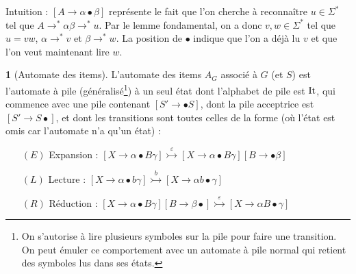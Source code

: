 \documentclass[10pt,a4paper,notitlepage]{article}
\theoremstyle{plain}
\theoremstyle{definition}
\newtheorem{defn}[thm]{\protect\definitionname}
\theoremstyle{definition}
\theoremstyle{remark}
\theoremstyle{remark}
\theoremstyle{plain}
\theoremstyle{plain}
\theoremstyle{plain}
\theoremstyle{remark}
\providecommand{\definitionname}{Définition}
\begin{document}
Intuition : $\left[A\to\alpha\bullet\beta\right]$ représente le fait
que l'on cherche à reconnaître $u\in\Sigma^{*}$ tel que $A\to^{*}\alpha\beta\to^{*}u$.
Par le lemme fondamental, on a donc $v,w\in\Sigma^{*}$ tel que $u=vw$,
$\alpha\to^{*}v$ et $\beta\to^{*}w$. La position de $\bullet$ indique
que l'on a déjà lu $v$ et que l'on veut maintenant lire $w$.
\begin{defn}[Automate des items]
	
	L'automate des items $A_{G}$ associé à $G$ (et $S$) est l'automate
	à pile (généralisé\footnote{On s'autorise à lire plusieurs symboles sur la pile pour faire une transition. On peut émuler ce comportement avec un automate à pile normal qui retient des symboles lus dans ses états.}) à un seul état dont l'alphabet de pile est $\operatorname{It}$,
	qui commence avec une pile contenant $\left[S'\to\bullet S\right]$,
	dont la pile \og acceptrice \fg{} est $\left[S'\to S\bullet\right]$,
	et dont les transitions sont toutes celles de la forme (où l'état
	est omis car l'automate n'a qu'un état) :
	\begin{itemize}
		\item[$(E)$]  \og Expansion \fg{} : $\left[X\to\alpha\bullet B\gamma\right]\overset{\varepsilon}{\rightarrowtail}\left[X\to\alpha\bullet B\gamma\right]\left[B\to\bullet\beta\right]$
		\item[$(L)$]  \og Lecture \fg{} : $\left[X\to\alpha\bullet b\gamma\right]\overset{b}{\rightarrowtail}\left[X\to\alpha b\bullet\gamma\right]$
		\item[$(R)$]  \og Réduction \fg{} : $\left[X\to\alpha\bullet B\gamma\right]\left[B\to\beta\bullet\right]\overset{\varepsilon}{\rightarrowtail}\left[X\to\alpha B\bullet\gamma\right]$ 
	\end{itemize}
\end{defn}
\end{document}
